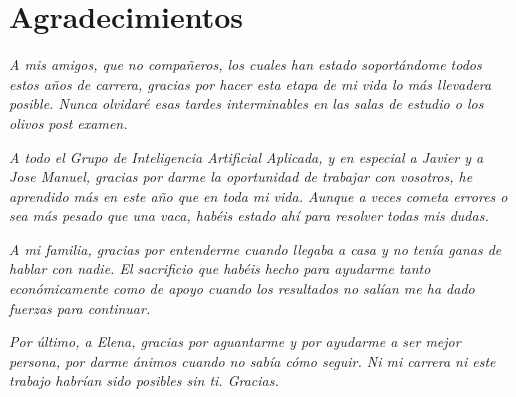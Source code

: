 \documentclass[12pt]{report} %
\begin{document}
\chapter*{Agradecimientos} %

\setcounter{page}{5}
	
	\textit{A mis amigos, que no compañeros, los cuales han estado soportándome todos estos años de carrera, gracias por hacer esta etapa de mi vida lo más llevadera
	posible. Nunca olvidaré esas tardes interminables en las salas de estudio o los olivos post examen.}

	\textit{A todo el Grupo de Inteligencia Artificial Aplicada, y en especial a Javier y a Jose Manuel, gracias por darme la oportunidad de trabajar con vosotros, he
	aprendido más en este año que en toda mi vida. Aunque a veces cometa errores o sea más pesado que una vaca, habéis estado ahí para resolver todas mis dudas.}

	\textit{A mi familia, gracias por entenderme cuando llegaba a casa y no tenía ganas de hablar con nadie. El sacrificio que habéis hecho para ayudarme tanto 
	económicamente como de apoyo cuando los resultados no salían me ha dado fuerzas para continuar.}
	
	\textit{ Por último, a Elena, gracias por aguantarme y por ayudarme a ser mejor persona, por darme ánimos cuando no sabía cómo seguir. Ni mi carrera ni este
	trabajo habrían sido posibles sin ti. Gracias.}
	\vfill
	
	\newpage %
	\thispagestyle{empty}
	\mbox{}
	


\tableofcontents
\thispagestyle{fancy}

\newpage %
\thispagestyle{empty}
\mbox{}

\listoffigures
\thispagestyle{fancy}

\newpage %
\thispagestyle{empty}
\mbox{}

\listoftables
\thispagestyle{fancy}

\newpage %
\thispagestyle{empty}
\mbox{}
\end{document}
